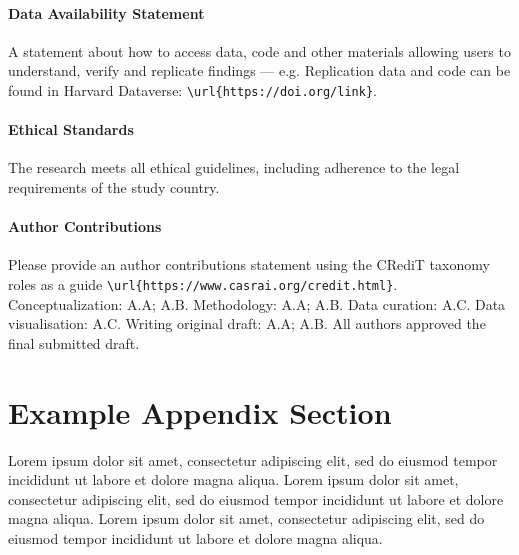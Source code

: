 \documentclass[
  journal=medium,
  manuscript=article-type,
  year=2020,
  volume=37,
]{cup-journal}
\begin{document}
\paragraph{Data Availability Statement}
A statement about how to access data, code and other materials allowing users to understand, verify and replicate findings --- e.g. Replication data and code can be found in Harvard Dataverse: \verb+\url{https://doi.org/link}+.

\paragraph{Ethical Standards}
The research meets all ethical guidelines, including adherence to the legal requirements of the study country.

\paragraph{Author Contributions}
Please provide an author contributions statement using the CRediT taxonomy roles as a guide {\verb+\url{https://www.casrai.org/credit.html}+}. Conceptualization: A.A; A.B. Methodology: A.A; A.B. Data curation: A.C. Data visualisation: A.C. Writing original draft: A.A; A.B. All authors approved the final submitted draft.


\printendnotes


\printbibliography[prenote={preamble}]
\appendix

\section{Example Appendix Section}

Lorem ipsum dolor sit amet, consectetur adipiscing elit, sed do eiusmod tempor incididunt ut labore et dolore magna aliqua. Lorem ipsum dolor sit amet, consectetur adipiscing elit, sed do eiusmod tempor incididunt ut labore et dolore magna aliqua. Lorem ipsum dolor sit amet, consectetur adipiscing elit, sed do eiusmod tempor incididunt ut labore et dolore magna aliqua. 
\end{document}

